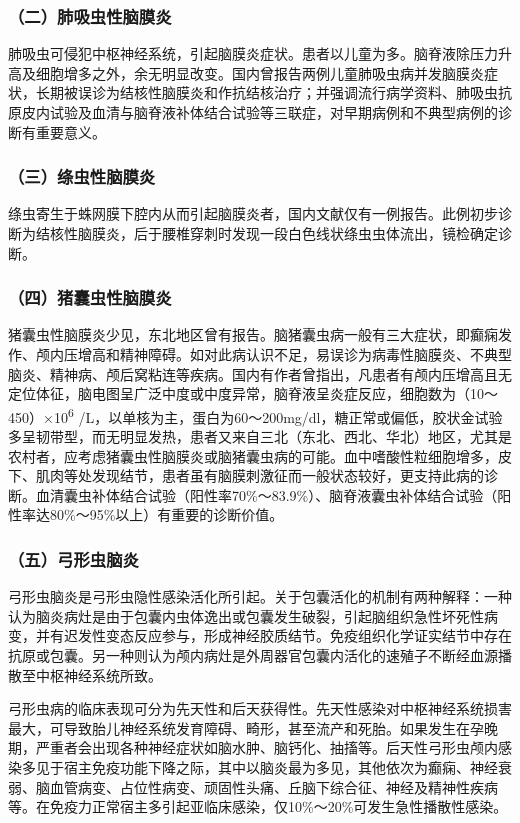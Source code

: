 \subsubsection{（二）肺吸虫性脑膜炎}

肺吸虫可侵犯中枢神经系统，引起脑膜炎症状。患者以儿童为多。脑脊液除压力升高及细胞增多之外，余无明显改变。国内曾报告两例儿童肺吸虫病并发脑膜炎症状，长期被误诊为结核性脑膜炎和作抗结核治疗；并强调流行病学资料、肺吸虫抗原皮内试验及血清与脑脊液补体结合试验等三联症，对早期病例和不典型病例的诊断有重要意义。

\subsubsection{（三）绦虫性脑膜炎}

绦虫寄生于蛛网膜下腔内从而引起脑膜炎者，国内文献仅有一例报告。此例初步诊断为结核性脑膜炎，后于腰椎穿刺时发现一段白色线状绦虫虫体流出，镜检确定诊断。

\subsubsection{（四）猪囊虫性脑膜炎}

猪囊虫性脑膜炎少见，东北地区曾有报告。脑猪囊虫病一般有三大症状，即癫痫发作、颅内压增高和精神障碍。如对此病认识不足，易误诊为病毒性脑膜炎、不典型脑炎、精神病、颅后窝粘连等疾病。国内有作者曾指出，凡患者有颅内压增高且无定位体征，脑电图呈广泛中度或中度异常，脑脊液呈炎症反应，细胞数为（10～450）×10\textsuperscript{6}
/L，以单核为主，蛋白为60～200mg/dl，糖正常或偏低，胶状金试验多呈韧带型，而无明显发热，患者又来自三北（东北、西北、华北）地区，尤其是农村者，应考虑猪囊虫性脑膜炎或脑猪囊虫病的可能。血中嗜酸性粒细胞增多，皮下、肌肉等处发现结节，患者虽有脑膜刺激征而一般状态较好，更支持此病的诊断。血清囊虫补体结合试验（阳性率70\%～83.9\%）、脑脊液囊虫补体结合试验（阳性率达80\%～95\%以上）有重要的诊断价值。

\subsubsection{（五）弓形虫脑炎}

弓形虫脑炎是弓形虫隐性感染活化所引起。关于包囊活化的机制有两种解释：一种认为脑炎病灶是由于包囊内虫体逸出或包囊发生破裂，引起脑组织急性坏死性病变，并有迟发性变态反应参与，形成神经胶质结节。免疫组织化学证实结节中存在抗原或包囊。另一种则认为颅内病灶是外周器官包囊内活化的速殖子不断经血源播散至中枢神经系统所致。

弓形虫病的临床表现可分为先天性和后天获得性。先天性感染对中枢神经系统损害最大，可导致胎儿神经系统发育障碍、畸形，甚至流产和死胎。如果发生在孕晚期，严重者会出现各种神经症状如脑水肿、脑钙化、抽搐等。后天性弓形虫颅内感染多见于宿主免疫功能下降之际，其中以脑炎最为多见，其他依次为癫痫、神经衰弱、脑血管病变、占位性病变、顽固性头痛、丘脑下综合征、神经及精神性疾病等。在免疫力正常宿主多引起亚临床感染，仅10\%～20\%可发生急性播散性感染。

